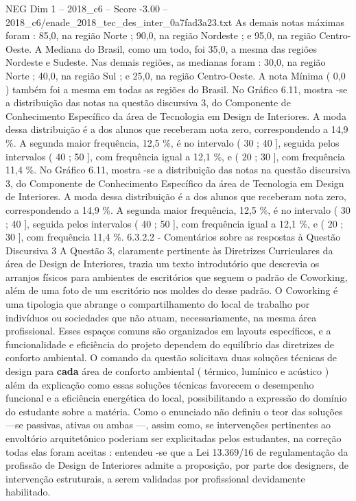 \begin{textsample}{NEG Dim 1 – 2018\_c6 – Score -3.00 – 2018\_c6/enade\_2018\_tec\_des\_inter\_0a7fad3a23.txt}
As demais notas máximas foram : 85,0, na região Norte ; 90,0, na região Nordeste ; e 95,0, na região Centro-Oeste.
A Mediana do Brasil, como um todo, foi 35,0, a mesma das regiões Nordeste e Sudeste.
Nas demais regiões, as medianas foram : 30,0, na região Norte ; 40,0, na região Sul ; e 25,0, na região Centro-Oeste.
A nota Mínima ( 0,0 ) também foi a mesma em todas as regiões do Brasil.
No Gráfico 6.11, mostra -se a distribuição das notas na questão discursiva 3, do Componente de Conhecimento Específico da área de Tecnologia em Design de Interiores.
A moda dessa distribuição é a dos alunos que receberam nota zero, correspondendo a 14,9 \%.
A segunda maior frequência, 12,5 \%, é no intervalo ( 30 ; 40 ], seguida pelos intervalos ( 40 ; 50 ], com frequência igual a 12,1 \%, e ( 20 ; 30 ], com frequência 11,4 \%.
No Gráfico 6.11, mostra -se a distribuição das notas na questão discursiva 3, do Componente de Conhecimento Específico da área de Tecnologia em Design de Interiores.
A moda dessa distribuição é a dos alunos que receberam nota zero, correspondendo a 14,9 \%.
A segunda maior frequência, 12,5 \%, é no intervalo ( 30 ; 40 ], seguida pelos intervalos ( 40 ; 50 ], com frequência igual a 12,1 \%, e ( 20 ; 30 ], com frequência 11,4 \%. 6.3.2.2 - Comentários sobre as respostas à Questão Discursiva 3 A Questão 3, claramente pertinente às Diretrizes Curriculares da área de Design de Interiores, trazia um texto introdutório que descrevia os arranjos físicos para ambientes de escritórios que seguem o padrão de Coworking, além de uma foto de um escritório nos moldes do desse padrão.
O Coworking é uma tipologia que abrange o compartilhamento do local de trabalho por indivíduos ou sociedades que não atuam, necessariamente, na mesma área profissional.
Esses espaços comuns são organizados em layouts específicos, e a funcionalidade e eficiência do projeto dependem do equilíbrio das diretrizes de conforto ambiental.
O comando da questão solicitava duas soluções técnicas de design para \textbf{cada} área de conforto ambiental ( térmico, lumínico e acústico ) além da explicação como essas soluções técnicas favorecem o desempenho funcional e a eficiência energética do local, possibilitando a expressão do domínio do estudante sobre a matéria.
Como o enunciado não definiu o teor das soluções—se passivas, ativas ou ambas —, assim como, se intervenções pertinentes ao envoltório arquitetônico poderiam ser explicitadas pelos estudantes, na correção todas elas foram aceitas : entendeu -se que a Lei 13.369/16 de regulamentação da profissão de Design de Interiores admite a proposição, por parte dos designers, de intervenção estruturais, a serem validadas por profissional devidamente habilitado.

\end{textsample}
